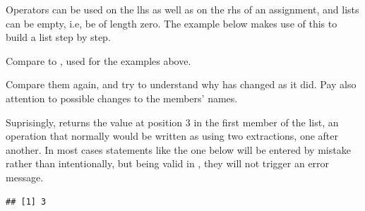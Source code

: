 \documentclass[krantz2]{krantz}\usepackage{knitr}
\begin{document}
\begin{playground}
Operators can be used on the lhs as well as on the rhs of an assignment, and lists can be empty, i.e, be of length zero. The example below makes use of this to build a list step by step.

\begin{knitrout}\footnotesize
{}\color{fgcolor}\begin{kframe}
\begin{alltt}
 \hlkwb{<-} \hlstd{()}
\hlstd{b.list[[}\hlstd{]]} \hlkwb{<-} \hlopt{:}
\hlstd{b.list[[}\hlstd{]]} \hlkwb{<-} 
\hlstd{b.list[[}\hlstd{]]} \hlkwb{<-} \hlstd{(}\hlstd{,} \hlstd{)}
\end{alltt}
\end{kframe}
\end{knitrout}

Compare  to , used for the examples above.

\begin{knitrout}\footnotesize
{}\color{fgcolor}\begin{kframe}
\begin{alltt}
\hlstd{b.list[[}\hlstd{]]} \hlkwb{<-} \hlstd{b.list[[}\hlstd{]]}
\end{alltt}
\end{kframe}
\end{knitrout}

Compare them again, and try to understand why  has changed as it did. Pay also attention to possible changes to the members' names.

\end{playground}

\begin{warningbox}
Suprisingly,  returns the value at position 3 in the first member of the list, an operation that normally would be written as  using two extractions, one after another. In most cases statements like the one below will be entered by mistake rather than intentionally, but being valid in \Rlang, they will not trigger an error message.

\begin{knitrout}\footnotesize
{}\color{fgcolor}\begin{kframe}
\begin{alltt}
\hlstd{a.list[[}\hlstd{(}\hlstd{,} \hlstd{)]]}
\end{alltt}
\begin{verbatim}
## [1] 3
\end{verbatim}
\end{kframe}
\end{knitrout}
\end{warningbox}
\end{document}
